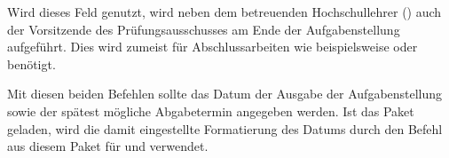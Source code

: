 \begin{Declaration}{}
\printdeclarationlist%
%
Wird dieses Feld genutzt, wird neben dem betreuenden Hochschullehrer 
() auch der Vorsitzende des Prüfungsausschusses am Ende der 
Aufgabenstellung aufgeführt. Dies wird zumeist für Abschlussarbeiten wie 
beispielsweise \masterthesisname{} oder \diplomathesisname{} benötigt.
\end{Declaration}

\begin{Declaration}{}
\begin{Declaration}{}
\printdeclarationlist%
%
Mit diesen beiden Befehlen sollte das Datum der Ausgabe der Aufgabenstellung 
sowie der spätest mögliche Abgabetermin angegeben werden. Ist das Paket 
 geladen, wird die damit eingestellte Formatierung des Datums 
durch den Befehl  aus diesem Paket für  und 
 verwendet.
\end{Declaration}
\end{Declaration}


